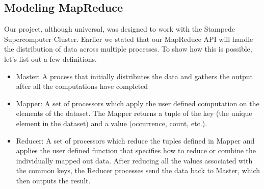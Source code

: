 \documentclass[11pt]{article}
\begin{document}
\subsection{Modeling MapReduce}
Our project, although universal, was designed to work with the Stampede Supercomputer Cluster. Earlier we stated that our MapReduce API will handle the distribution of data across multiple processes. To show how this is possible, let's list out a few definitions.
\begin{itemize}
  \item Master: A process that initially distributes the data and gathers the output after all the computations have completed
  \item Mapper: A set of processors which apply the user defined computation on the elements of the dataset. The Mapper returns a tuple of the key (the unique element in the dataset) and a value (occurrence, count, etc.).
  \item Reducer: A set of processors which reduce the tuples defined in Mapper and applies the user defined function that specifies how to reduce or combine the individually mapped out data. After reducing all the values associated with the common keys, the Reducer processes send the data back to Master, which then outputs the result.
\end{itemize}
\end{document}
